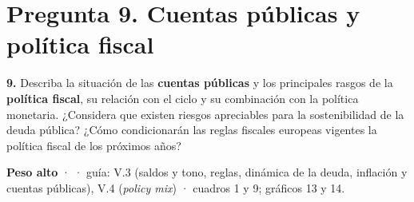 \section*{Pregunta 9. Cuentas públicas y política fiscal}

\begin{enunciado}
\textbf{9.} Describa la situación de las \textbf{cuentas públicas} y los principales rasgos de la \textbf{política fiscal}, su relación con el ciclo y su combinación con la política monetaria. ¿Considera que existen riesgos apreciables para la sostenibilidad de la deuda pública? ¿Cómo condicionarán las reglas fiscales europeas vigentes la política fiscal de los próximos años?

\smallskip
\textbf{Peso alto} ·  · guía: V.3 (saldos y tono, reglas, dinámica de la deuda, inflación y cuentas públicas), V.4 (\emph{policy mix}) · cuadros 1 y 9; gráficos 13 y 14.
\end{enunciado}

